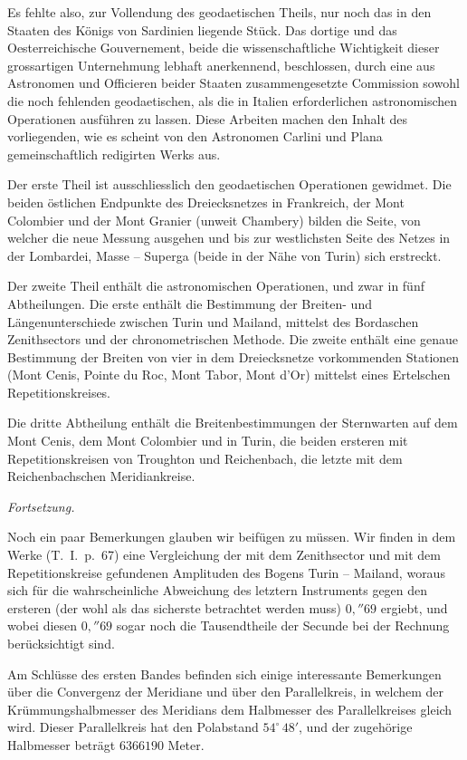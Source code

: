 \documentclass[fontsize=10pt,paper=a5,pagesize,headings=small,headinclude=true,footinclude=true]{scrbook}
\begin{document}
Es fehlte also, zur Vollendung des geodaetischen Theils, nur noch das in den Staaten des Königs von Sardinien liegende Stück. Das dortige und das Oesterreichische Gouvernement, beide die wissenschaftliche Wichtigkeit dieser grossartigen Unternehmung lebhaft anerkennend, beschlossen, durch eine aus Astronomen und Officieren beider Staaten zusammengesetzte Commission sowohl die noch fehlenden geodaetischen, als die in Italien erforderlichen astronomischen Operationen ausführen zu lassen. Diese Arbeiten machen den Inhalt des vorliegenden, wie es scheint von den Astronomen Carlini und Plana gemeinschaftlich redigirten Werks aus.

Der erste Theil ist ausschliesslich den geodaetischen Operationen gewidmet. Die beiden östlichen Endpunkte des Dreiecksnetzes in Frankreich, der Mont Colombier und der Mont Granier (unweit Chambery) bilden die Seite, von welcher die neue Messung ausgehen und bis zur westlichsten Seite des Netzes in der Lombardei, Masse -- Superga (beide in der Nähe von Turin) sich erstreckt.

Der zweite Theil enthält die astronomischen Operationen, und zwar in fünf Abtheilungen. Die erste enthält die Bestimmung der Breiten- und Längenunterschiede zwischen Turin und Mailand, mittelst des Bordaschen Zenithsectors und der chronometrischen Methode. Die zweite enthält eine genaue Bestimmung der Breiten von vier in dem Dreiecksnetze vorkommenden Stationen (Mont Cenis, Pointe du Roc, Mont Tabor, Mont d'Or) mittelst eines Ertelschen Repetitionskreises.

Die dritte Abtheilung enthält die Breitenbestimmungen der Sternwarten auf dem Mont Cenis, dem Mont Colombier und in Turin, die beiden ersteren mit Repetitionskreisen von Troughton und Reichenbach, die letzte mit dem Reichenbachschen Meridiankreise.

\textit{Fortsetzung.}

Noch ein paar Bemerkungen glauben wir beifügen zu müssen. Wir finden in dem Werke (T.~I.~p.~67) eine Vergleichung der mit dem Zenithsector und mit dem Repetitionskreise gefundenen Amplituden des Bogens Turin -- Mailand, woraus sich für die wahrscheinliche Abweichung des letztern Instruments gegen den ersteren (der wohl als das sicherste betrachtet werden muss) $0{,}''69$ ergiebt, und wobei diesen $0{,}''69$ sogar noch die Tausendtheile der Secunde bei der Rechnung berücksichtigt sind.

Am Schlüsse des ersten Bandes befinden sich einige interessante Bemerkungen über die Convergenz der Meridiane und über den Parallelkreis, in welchem der Krümmungshalbmesser des Meridians dem Halbmesser des Parallelkreises gleich wird. Dieser Parallelkreis hat den Polabstand $54^\circ\,48'$, und der zugehörige Halbmesser beträgt $6366190$ Meter.
\end{document}
